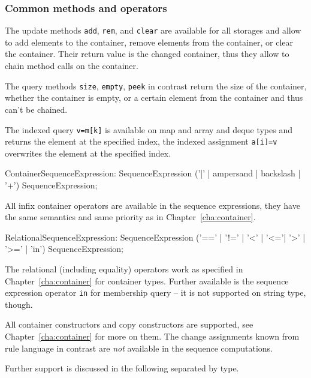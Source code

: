 \subsubsection*{Common methods and operators}

The update methods \texttt{add}, \texttt{rem}, and \texttt{clear} are available for all storages and allow to add elements to the container, remove elements from the container, or clear the container.
Their return value is the changed container, thus they allow to chain method calls on the container.

The query methods \texttt{size}, \texttt{empty}, \texttt{peek} in contrast return the size of the container, whether the container is empty, or a certain element from the container and thus can't be chained.

The indexed query \texttt{v=m[k]} is available on map and array and deque types and returns the element at the specified index,
the indexed assignment \texttt{a[i]=v} overwrites the element at the specified index.

\begin{rail}
  ContainerSequenceExpression: 
    SequenceExpression ('|' | ampersand | backslash | '+') SequenceExpression;
\end{rail}

All infix container operators are available in the sequence expressions, they have the same semantics and same priority as in Chapter~\ref{cha:container}.

\begin{rail}
  RelationalSequenceExpression: 
    SequenceExpression ('==' | '!=' | '<' | '<='| '>' | '>=' | 'in') SequenceExpression;
\end{rail}

The relational (including equality) operators work as specified in Chapter~\ref{cha:container} for container types.
Further available is the sequence expression operator \texttt{in} for membership query -- it is not supported on string type, though.

All container constructors and copy constructors are supported, see Chapter~\ref{cha:container} for more on them.
The change assignments known from rule language in contrast are \emph{not} available in the sequence computations.

Further support is discussed in the following separated by type.

